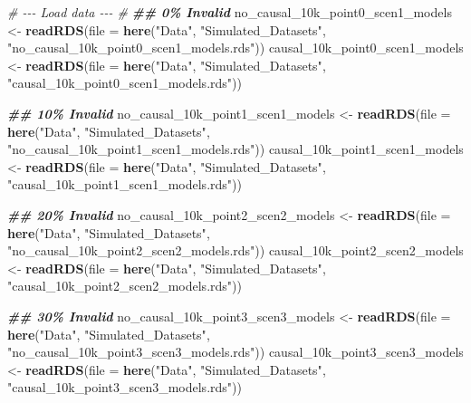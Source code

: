 \documentclass[
]{article}
\newenvironment{Shaded}{\begin{snugshade}}{\end{snugshade}}
\newcommand{\AttributeTok}[1]{\textcolor[rgb]{0.13,0.29,0.53}{#1}}
\newcommand{\CommentTok}[1]{\textcolor[rgb]{0.56,0.35,0.01}{\textit{#1}}}
\newcommand{\DocumentationTok}[1]{\textcolor[rgb]{0.56,0.35,0.01}{\textbf{\textit{#1}}}}
\newcommand{\FunctionTok}[1]{\textcolor[rgb]{0.13,0.29,0.53}{\textbf{#1}}}
\newcommand{\NormalTok}[1]{#1}
\newcommand{\OtherTok}[1]{\textcolor[rgb]{0.56,0.35,0.01}{#1}}
\newcommand{\StringTok}[1]{\textcolor[rgb]{0.31,0.60,0.02}{#1}}
\begin{document}
\begin{Shaded}
\begin{Highlighting}[]
\CommentTok{\# {-}{-}{-} Load data {-}{-}{-} \#}
\DocumentationTok{\#\# 0\% Invalid}
\NormalTok{no\_causal\_10k\_point0\_scen1\_models }\OtherTok{\textless{}{-}} \FunctionTok{readRDS}\NormalTok{(}\AttributeTok{file =} \FunctionTok{here}\NormalTok{(}\StringTok{"Data"}\NormalTok{, }\StringTok{"Simulated\_Datasets"}\NormalTok{, }\StringTok{"no\_causal\_10k\_point0\_scen1\_models.rds"}\NormalTok{))}
\NormalTok{causal\_10k\_point0\_scen1\_models }\OtherTok{\textless{}{-}} \FunctionTok{readRDS}\NormalTok{(}\AttributeTok{file =} \FunctionTok{here}\NormalTok{(}\StringTok{"Data"}\NormalTok{, }\StringTok{"Simulated\_Datasets"}\NormalTok{, }\StringTok{"causal\_10k\_point0\_scen1\_models.rds"}\NormalTok{))}

\DocumentationTok{\#\# 10\% Invalid}
\NormalTok{no\_causal\_10k\_point1\_scen1\_models }\OtherTok{\textless{}{-}} \FunctionTok{readRDS}\NormalTok{(}\AttributeTok{file =} \FunctionTok{here}\NormalTok{(}\StringTok{"Data"}\NormalTok{, }\StringTok{"Simulated\_Datasets"}\NormalTok{, }\StringTok{"no\_causal\_10k\_point1\_scen1\_models.rds"}\NormalTok{))}
\NormalTok{causal\_10k\_point1\_scen1\_models }\OtherTok{\textless{}{-}} \FunctionTok{readRDS}\NormalTok{(}\AttributeTok{file =} \FunctionTok{here}\NormalTok{(}\StringTok{"Data"}\NormalTok{, }\StringTok{"Simulated\_Datasets"}\NormalTok{, }\StringTok{"causal\_10k\_point1\_scen1\_models.rds"}\NormalTok{))}

\DocumentationTok{\#\# 20\% Invalid}
\NormalTok{no\_causal\_10k\_point2\_scen2\_models }\OtherTok{\textless{}{-}} \FunctionTok{readRDS}\NormalTok{(}\AttributeTok{file =} \FunctionTok{here}\NormalTok{(}\StringTok{"Data"}\NormalTok{, }\StringTok{"Simulated\_Datasets"}\NormalTok{, }\StringTok{"no\_causal\_10k\_point2\_scen2\_models.rds"}\NormalTok{))}
\NormalTok{causal\_10k\_point2\_scen2\_models }\OtherTok{\textless{}{-}} \FunctionTok{readRDS}\NormalTok{(}\AttributeTok{file =} \FunctionTok{here}\NormalTok{(}\StringTok{"Data"}\NormalTok{, }\StringTok{"Simulated\_Datasets"}\NormalTok{, }\StringTok{"causal\_10k\_point2\_scen2\_models.rds"}\NormalTok{))}

\DocumentationTok{\#\# 30\% Invalid}
\NormalTok{no\_causal\_10k\_point3\_scen3\_models }\OtherTok{\textless{}{-}} \FunctionTok{readRDS}\NormalTok{(}\AttributeTok{file =} \FunctionTok{here}\NormalTok{(}\StringTok{"Data"}\NormalTok{, }\StringTok{"Simulated\_Datasets"}\NormalTok{, }\StringTok{"no\_causal\_10k\_point3\_scen3\_models.rds"}\NormalTok{))}
\NormalTok{causal\_10k\_point3\_scen3\_models }\OtherTok{\textless{}{-}} \FunctionTok{readRDS}\NormalTok{(}\AttributeTok{file =} \FunctionTok{here}\NormalTok{(}\StringTok{"Data"}\NormalTok{, }\StringTok{"Simulated\_Datasets"}\NormalTok{, }\StringTok{"causal\_10k\_point3\_scen3\_models.rds"}\NormalTok{))}



\end{Highlighting}
\end{Shaded}
\end{document}
